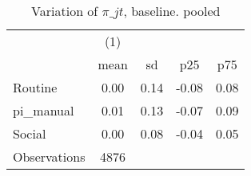 \begin{table}[htbp]\centering
\def\sym#1{\ifmmode^{#1}\else\(^{#1}\)\fi}
\caption{Variation of $\pi\_{jt}$, baseline. pooled}
\begin{tabular}{l*{1}{cccc}}
\toprule
                    &\multicolumn{1}{c}{(1)}&            &            &            \\
                    &        mean&          sd&         p25&         p75\\
\midrule
Routine             &        0.00&        0.14&       -0.08&        0.08\\
pi\_manual           &        0.01&        0.13&       -0.07&        0.09\\
Social              &        0.00&        0.08&       -0.04&        0.05\\
\midrule
Observations        &        4876&            &            &            \\
\bottomrule
\end{tabular}
\end{table}
